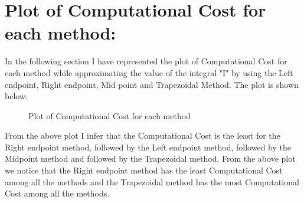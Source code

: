 \documentclass[12pt,a4paper]{article}
\begin{document}
\section{Plot of Computational Cost for each method:}
In the following section I have represented the plot of Computational Cost for each method while approximating the value of the integral "I" by using the Left endpoint, Right endpoint, Mid point and Trapezoidal Method. The plot is shown below:
\clearpage
\begin{figure}[!ht]
	\begin{center}
	\end{center}
	\caption{Plot of Computational Cost for each method}
\end{figure}
\noindent
From the above plot I infer that the Computational Cost is the least for the Right endpoint method, followed by the Left endpoint method, followed by the Midpoint method and followed by the Trapezoidal method. From the above plot we notice that the Right endpoint method has the least Computational Cost among all the methods and the Trapezoidal method has the most Computational Cost among all the methods.
\end{document}
